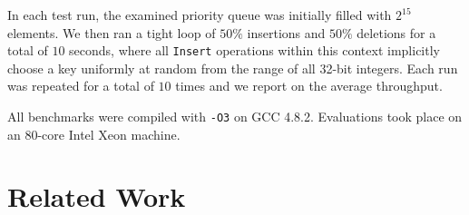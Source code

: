 \documentclass[a4paper,10pt]{article}
\begin{document}
In each test run, the examined priority queue was initially filled with $2^{15}$
elements. We then ran a tight loop of $50\%$ insertions and $50\%$ deletions
for a total of $10$ seconds, where all \lstinline|Insert|
operations within this context implicitly choose a key uniformly at random from
the range of all 32-bit integers. Each run was repeated for a total of $10$ times %
and we report on the average throughput.

All benchmarks were compiled with \verb|-O3| on GCC 4.8.2. Evaluations took place
on an 80-core Intel Xeon machine.


\begin{comment}
Sections / rough structure:
* Basic concepts and definitions. Linearizability, sequ./quiescent consistency,
  lock-free, wait-free, disjoint-access parallelism (one of the papers has good
  summaries of these).
  Maybe atomic primitives such as CAS (but probably not).
* Priority queue definitions, semantics, usages. Mention inherent
  non-scalability through DeleteMin().
* Skiplist, heap definitions, semantics, usages.
* Follow development of current state of the art from Hunt Heap ~> Shavit ~>
  Tsigas ~> Linden.
* Maybe benchmarks on mars.

Additional notes:
* Sketch development: Heap, Fraser Skiplist (Details, mention why linearizable),
  Sundell/Tsigas, other Skiplist-based PQs
* Modern developments: SprayList, Wimmer et al. Relation to other relaxed structures such as k-FIFO.
\end{comment}

\section{Related Work}


\begin{comment}
  * hunt: most efficient old-school algorithm
  * lots of other older references in [4]
  * israeli, rappoport: wait-free, non-available atomic primitive
  * lotan, shavit [4]: skiplist, lock-based. first to propose usage of skip-lists [11]
  * sundell, tsigas [3]: skiplist, lock-free, linearizable, unique priorities
  * herlihy, shavit in art of multiprocessor programming: based on [4], lock-free.
  * linden, jonsson [11]: skiplist, lock-free, linearizable, reduced mem contention.
    first lock-free PQ algorithm [11, 12]
  * specialized versions such as
    * bounded priorities: [7] and others
    * probabilistic extractMin, extractMany: [9]
\end{comment}
\end{document}
